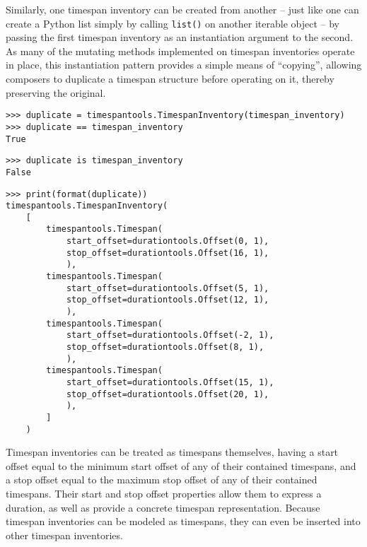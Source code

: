 \noindent Similarly, one timespan inventory can be created from another -- just
like one can create a Python list simply by calling \texttt{list()} on another
iterable object -- by passing the first timespan inventory as an instantiation
argument to the second. As many of the mutating methods implemented on timespan
inventories operate in place, this instantiation pattern provides a simple
means of \enquote{copying}, allowing composers to duplicate a timespan
structure before operating on it, thereby preserving the original.

\begin{comment}
<abjad>
duplicate = timespantools.TimespanInventory(timespan_inventory)
duplicate == timespan_inventory
duplicate is timespan_inventory
print(format(duplicate))
</abjad>
\end{comment}

\begin{singlespacing}
\vspace{-0.5\baselineskip}
\begin{lstlisting}
>>> duplicate = timespantools.TimespanInventory(timespan_inventory)
>>> duplicate == timespan_inventory
True
\end{lstlisting}
\begin{lstlisting}
>>> duplicate is timespan_inventory
False
\end{lstlisting}
\begin{lstlisting}
>>> print(format(duplicate))
timespantools.TimespanInventory(
    [
        timespantools.Timespan(
            start_offset=durationtools.Offset(0, 1),
            stop_offset=durationtools.Offset(16, 1),
            ),
        timespantools.Timespan(
            start_offset=durationtools.Offset(5, 1),
            stop_offset=durationtools.Offset(12, 1),
            ),
        timespantools.Timespan(
            start_offset=durationtools.Offset(-2, 1),
            stop_offset=durationtools.Offset(8, 1),
            ),
        timespantools.Timespan(
            start_offset=durationtools.Offset(15, 1),
            stop_offset=durationtools.Offset(20, 1),
            ),
        ]
    )
\end{lstlisting}
\end{singlespacing}

Timespan inventories can be treated as timespans themselves, having
a start offset equal to the minimum start offset of any of their contained
timespans, and a stop offset equal to the maximum stop offset of any of their
contained timespans. Their start and stop offset properties allow them to
express a duration, as well as provide a concrete timespan representation.
Because timespan inventories can be modeled as timespans, they can even be
inserted into other timespan inventories.

